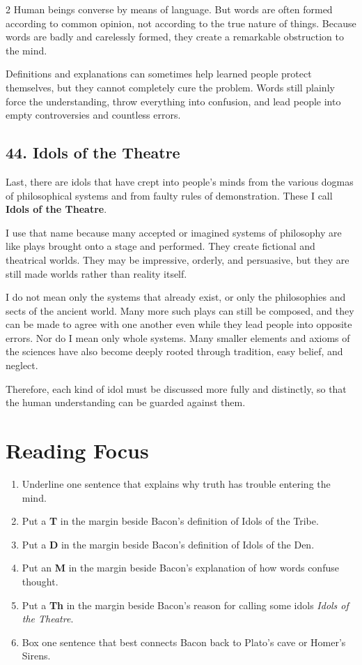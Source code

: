\documentclass[12pt]{article}
\begin{document}
\begin{multicols}{2}
Human beings converse by means of language. But words are often formed according to common opinion, not according to the true nature of things. Because words are badly and carelessly formed, they create a remarkable obstruction to the mind.

Definitions and explanations can sometimes help learned people protect themselves, but they cannot completely cure the problem. Words still plainly force the understanding, throw everything into confusion, and lead people into empty controversies and countless errors.

\subsection*{44. Idols of the Theatre}
Last, there are idols that have crept into people's minds from the various dogmas of philosophical systems and from faulty rules of demonstration. These I call \textbf{Idols of the Theatre}.

I use that name because many accepted or imagined systems of philosophy are like plays brought onto a stage and performed. They create fictional and theatrical worlds. They may be impressive, orderly, and persuasive, but they are still made worlds rather than reality itself.

I do not mean only the systems that already exist, or only the philosophies and sects of the ancient world. Many more such plays can still be composed, and they can be made to agree with one another even while they lead people into opposite errors. Nor do I mean only whole systems. Many smaller elements and axioms of the sciences have also become deeply rooted through tradition, easy belief, and neglect.

Therefore, each kind of idol must be discussed more fully and distinctly, so that the human understanding can be guarded against them.

\section*{Reading Focus}
\begin{enumerate}[leftmargin=*, itemsep=0.2em]
\item Underline one sentence that explains why truth has trouble entering the mind.
\item Put a \textbf{T} in the margin beside Bacon's definition of Idols of the Tribe.
\item Put a \textbf{D} in the margin beside Bacon's definition of Idols of the Den.
\item Put an \textbf{M} in the margin beside Bacon's explanation of how words confuse thought.
\item Put a \textbf{Th} in the margin beside Bacon's reason for calling some idols \textit{Idols of the Theatre}.
\item Box one sentence that best connects Bacon back to Plato's cave or Homer's Sirens.
\end{enumerate}


\end{multicols}
\end{document}
